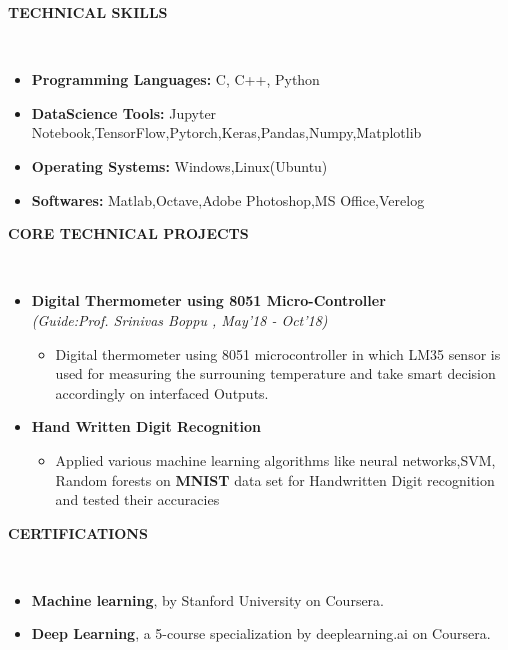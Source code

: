 \documentclass[a4paper,10pt]{article}
\newcommand{\isep}{-2 pt}
\newcommand{\lsep}{-0.5cm}
\newcommand{\resheading}[1]{{\small \colorbox{mygrey}{\begin{minipage}{0.975\textwidth}{\textbf{#1 \vphantom{p\^{E}}}}\end{minipage}}}}
\begin{document}
\resheading{\textbf{TECHNICAL SKILLS} }\\[\lsep]
\begin{itemize}
\item \noindent \textbf{Programming Languages:} C, C++, Python\item \noindent \textbf{DataScience Tools:} Jupyter Notebook,TensorFlow,Pytorch,Keras,Pandas,Numpy,Matplotlib 
\item \noindent \textbf{Operating Systems:} Windows,Linux(Ubuntu)
\item \noindent \textbf{Softwares:} Matlab,Octave,Adobe Photoshop,MS Office,Verelog  
\end{itemize}

\resheading{\textbf{CORE TECHNICAL PROJECTS} }\\[\lsep]
\begin{itemize}
\item \textbf{Digital Thermometer using 8051 Micro-Controller
}\\
 \emph{(Guide:Prof. Srinivas Boppu
, May'18 - Oct'18)} \\[-0.6cm]
	\begin{itemize}\itemsep \isep
	\item Digital thermometer using 8051 microcontroller in which LM35 sensor is used for measuring the surrouning temperature and take smart decision accordingly on interfaced Outputs.
	\end{itemize}

\item \textbf{Hand Written Digit Recognition} \\[\lsep]

	\begin{itemize}\itemsep \isep
	\item Applied various machine learning algorithms like neural networks,SVM, Random forests on \textbf{MNIST} data set for Handwritten Digit recognition and tested their accuracies
	\end{itemize}
\end{itemize}

\resheading{\textbf{CERTIFICATIONS} }\\[\lsep]
\begin{itemize}
\item \noindent \textbf{Machine learning}, by Stanford University on Coursera.
\item \noindent \textbf{Deep Learning}, a 5-course specialization by deeplearning.ai on Coursera.

\end{itemize}
\end{document}

